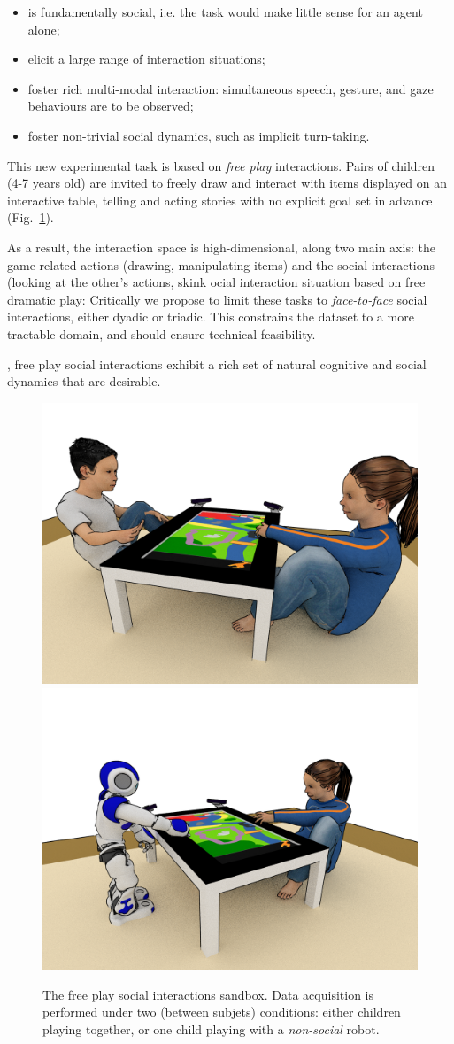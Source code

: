 \documentclass{article}
\newcommand{\ie}{i.e.\xspace}
\begin{document}
\begin{itemize}
    \item is fundamentally social, \ie the task would make little sense for an
        agent alone;
    \item elicit a large range of interaction situations;
    \item foster rich multi-modal interaction: simultaneous speech, gesture, and gaze
        behaviours are to be observed;
    \item foster non-trivial social dynamics, such as implicit turn-taking.
\end{itemize}

This new experimental task is based on \emph{free play} interactions. Pairs of
children (4-7 years old) are invited to freely draw and interact with items
displayed on an interactive table, telling and acting stories with no explicit
goal set in advance (Fig.~\ref{fig|setup}).

As a result, the interaction space is high-dimensional, along two main axis: the
game-related actions (drawing, manipulating items) and the social interactions
(looking at the other's actions, skink
ocial interaction situation based on
free dramatic play: 
Critically we propose to limit these tasks to
\emph{face-to-face} social interactions, either dyadic or triadic. This constrains the dataset to
a more tractable domain, and should ensure technical feasibility. 




, free play social
interactions exhibit a rich set of natural cognitive and social dynamics that
are desirable.


\begin{figure}
    \centering
    \includegraphics[width=0.4\linewidth]{setup-child-child.png}
    \hspace{1em}
    \includegraphics[width=0.4\linewidth]{setup-child-robot.png}
    \caption{The free play social interactions sandbox. Data acquisition is
    performed under two (between subjets) conditions: either children playing together, or one
    child playing with a \emph{non-social} robot.}
    \label{fig|setup}
\end{figure}
\end{document}

